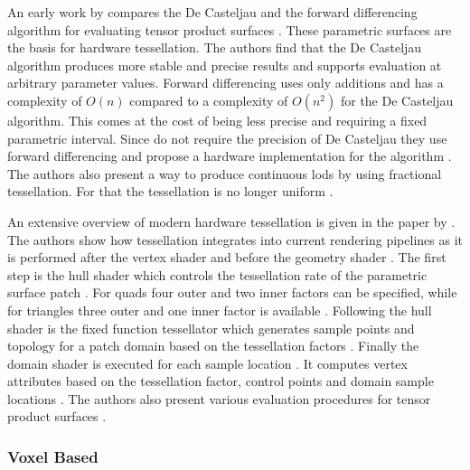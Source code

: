 An early work by \citeauthor{moreton_tessellation} compares the De Casteljau and the forward differencing algorithm for evaluating tensor product surfaces \cite{moreton_tessellation}.
These parametric surfaces are the basis for hardware tessellation.
The authors find that the De Casteljau algorithm produces more stable and precise results and supports evaluation at arbitrary parameter values.
Forward differencing uses only additions and has a complexity of $O(n)$ compared to a complexity of $O(n^2)$ for the De Casteljau algorithm.
This comes at the cost of being less precise and requiring a fixed parametric interval.
Since \citeauthor{moreton_tessellation} do not require the precision of De Casteljau they use forward differencing and propose a hardware implementation for the algorithm \cite{moreton_tessellation}.
The authors also present a way to produce continuous \acp{lod} by using fractional tessellation.
For that the tessellation is no longer uniform \cite{moreton_tessellation}.

An extensive overview of modern hardware tessellation is given in the paper \cite{niessner_tessellation} by \citeauthor{niessner_tessellation} \cite{niessner_tessellation}.
The authors show how tessellation integrates into current rendering pipelines as it is performed after the vertex shader and before the geometry shader \cite{niessner_tessellation}.
The first step is the hull shader which controls the tessellation rate of the parametric surface patch \cite{niessner_tessellation}.
For quads four outer and two inner factors can be specified, while for triangles three outer and one inner factor is available \cite{niessner_tessellation}.
Following the hull shader is the fixed function tessellator which generates sample points and topology for a patch domain based on the tessellation factors \cite{niessner_tessellation}.
Finally the domain shader is executed for each sample location \cite{niessner_tessellation}.
It computes vertex attributes based on the tessellation factor, control points and domain sample locations \cite{niessner_tessellation}.
The authors also present various evaluation procedures for tensor product surfaces \cite{niessner_tessellation}.

\subsubsection*{Voxel Based}


